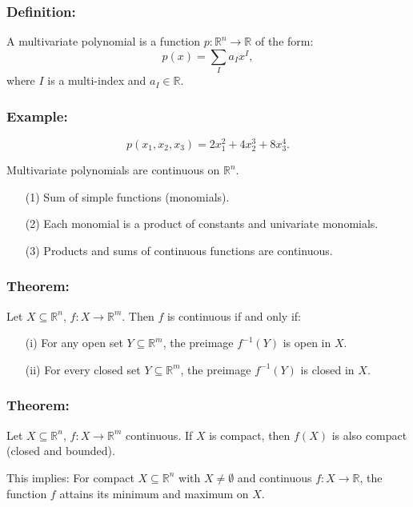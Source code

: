 \documentclass{article}
\begin{document}
\subsubsection*{Definition:}
A multivariate polynomial is a function \( p: \mathbb{R}^n \rightarrow \mathbb{R} \) of the form:
\[
p(x) = \sum_{I} a_I x^I,
\]
where \( I \) is a multi-index and \( a_I \in \mathbb{R} \).

\subsubsection*{Example:}
\[
p(x_1, x_2, x_3) = 2x_1^2 + 4x_2^3 + 8x_3^4.
\]

Multivariate polynomials are continuous on \( \mathbb{R}^n \).

\begin{enumerate}
    \item[(1)] Sum of simple functions (monomials).
    \item[(2)] Each monomial is a product of constants and univariate monomials.
    \item[(3)] Products and sums of continuous functions are continuous.
\end{enumerate}

\subsubsection{Theorem:}
Let \( X \subseteq \mathbb{R}^n \), \( f: X \rightarrow \mathbb{R}^m \). Then \( f \) is continuous if and only if:

\begin{enumerate}
    \item[(i)] For any open set \( Y \subseteq \mathbb{R}^m \), the preimage \( f^{-1}(Y) \) is open in \( X \).
    \item[(ii)] For every closed set \( Y \subseteq \mathbb{R}^m \), the preimage \( f^{-1}(Y) \) is closed in \( X \).
\end{enumerate}

\subsubsection{Theorem:}
Let \( X \subseteq \mathbb{R}^n \), \( f: X \rightarrow \mathbb{R}^m \) continuous. If \( X \) is compact, then \( f(X) \) is also compact (closed and bounded).

This implies: For compact \( X \subseteq \mathbb{R}^n \) with \( X \neq \emptyset \) and continuous \( f: X \rightarrow \mathbb{R} \), the function \( f \) attains its minimum and maximum on \( X \).
\vspace{10mm}
\end{document}
